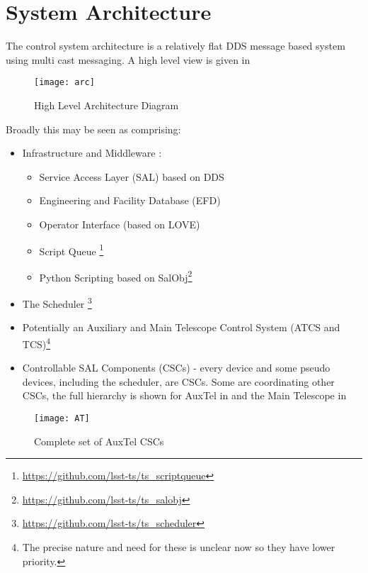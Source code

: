 \section{System Architecture} \label{sec:sysarc}


The control system architecture is a relatively flat DDS message based system using multi cast messaging. A high level view is given in 



\begin{figure}
\begin{center}
\texttt{[image: arc]}
\caption{High Level Architecture Diagram\label{fig:arc}}
\end{center}
\end{figure}

Broadly this may be seen as comprising:
\begin{itemize}
\item Infrastructure and Middleware :
	\begin{itemize}
	\item Service Access Layer (SAL) based on DDS
	\item Engineering and Facility Database (EFD)
	\item Operator Interface (based on LOVE)
	\item Script Queue  \footnote{\url{https://github.com/lsst-ts/ts_scriptqueue}}
	\item Python Scripting based on SalObj\footnote{\url{https://github.com/lsst-ts/ts_salobj}}
	\end{itemize}
\item The Scheduler \footnote{\url{https://github.com/lsst-ts/ts_scheduler}}
\item Potentially an Auxiliary and Main Telescope Control System (ATCS and TCS)\footnote {The precise nature and need for these is unclear now so they have lower priority.}
\item Controllable SAL Components (CSCs) - every device and some pseudo devices, including the scheduler, are CSCs. Some are coordinating other CSCs, the full hierarchy is shown for AuxTel in  and the Main Telescope in 
\end{itemize}

\begin{figure}
\begin{center}
\texttt{[image: AT]}
\caption{Complete set of AuxTel CSCs\label{fig:atcscs}}
\end{center}
\end{figure}

